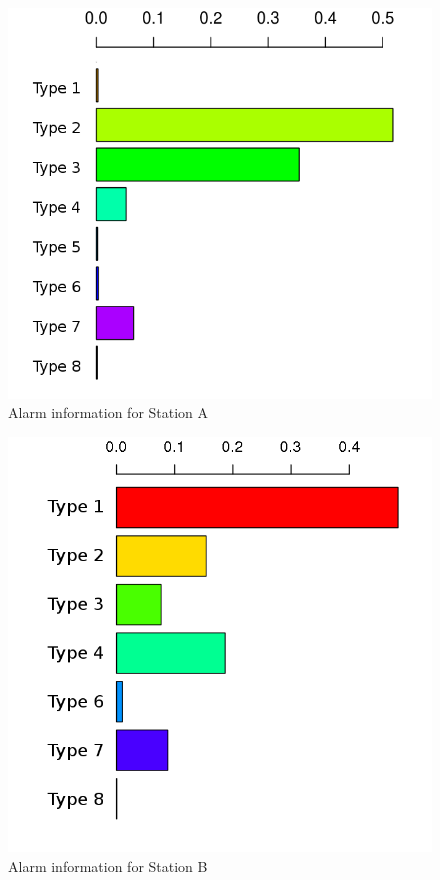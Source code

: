 \begin{figure}[htb]
 \centering
 \includegraphics[width=\textwidth]{./img/albacete_graph.png}
 \caption{Alarm information for Station A}
 \label{fig:albacete_chart}
\end{figure}
\begin{figure}[htb]
 \centering
 \includegraphics[width=\textwidth]{./img/antequera_graph.png}
 \caption{Alarm information for Station B}
 \label{fig:antequera_chart}
\end{figure}
